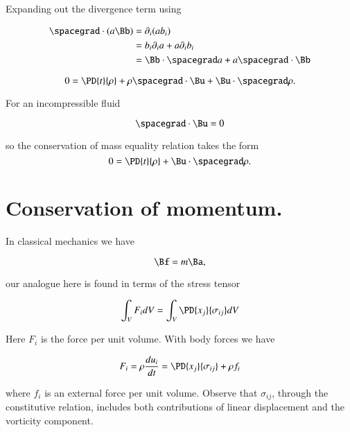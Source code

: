 Expanding out the divergence term using

\begin{align*}
\spacegrad \cdot (a \Bb)
&=
\partial_i (a b_i) \\
&=
b_i \partial_i a 
+
a \partial_i b_i \\
&=
\Bb \cdot \spacegrad a
+ a \spacegrad \cdot \Bb
\end{align*}

\begin{equation}\label{eqn:continuumL10:90}
0 = \PD{t}{\rho} 
+ \rho \spacegrad \cdot \Bu
+ \Bu \cdot \spacegrad \rho.
\end{equation}

For an incompressible fluid 

\begin{equation}\label{eqn:continuumL10:110}
\spacegrad \cdot \Bu = 0
\end{equation}

so the conservation of mass equality relation takes the form
\begin{equation}\label{eqn:continuumL10:90b}
0 = \PD{t}{\rho} + \Bu \cdot \spacegrad \rho.
\end{equation}

\section{Conservation of momentum.}

In classical mechanics we have

\begin{equation}\label{eqn:continuumL10:130}
\Bf = m \Ba,
\end{equation}

our analogue here is found in terms of the stress tensor

\begin{equation}\label{eqn:continuumL10:150}
\int_V F_i dV = \int_V \PD{x_j}{\sigma_{ij}} dV
\end{equation}

Here $F_i$ is the force per unit volume.  With body forces we have

\begin{equation}\label{eqn:continuumL10:170}
F_i = \rho \frac{du_i}{dt} = \PD{x_j}{\sigma_{ij}} + \rho f_i
\end{equation}

where $f_i$ is an external force per unit volume.  Observe that $\sigma_{ij}$, through the constitutive relation, includes both contributions of linear displacement and the vorticity component.  

